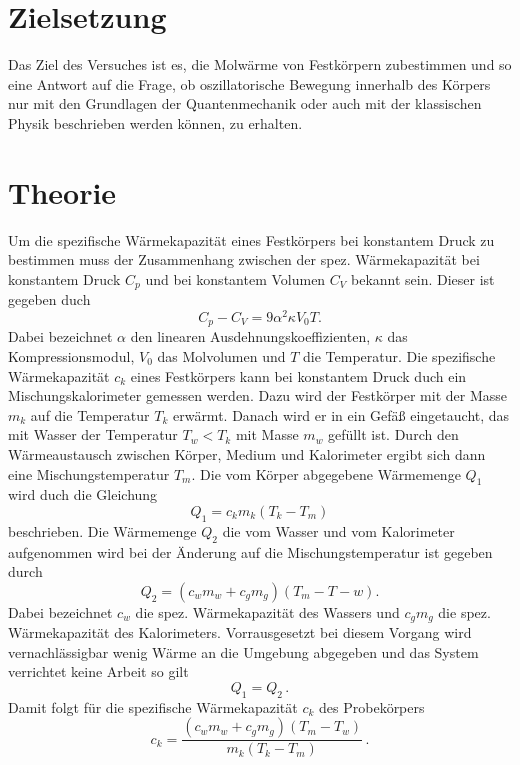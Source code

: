 \section{Zielsetzung}
Das Ziel des Versuches ist es, die Molwärme von Festkörpern zubestimmen und
so eine Antwort auf die Frage, ob oszillatorische Bewegung innerhalb des Körpers
nur mit den Grundlagen der Quantenmechanik oder auch mit der klassischen Physik
beschrieben werden können, zu erhalten.
\section{Theorie}
\label{sec:Theorie}
Um die spezifische Wärmekapazität eines Festkörpers bei konstantem Druck zu
bestimmen muss der Zusammenhang zwischen der spez. Wärmekapazität bei
konstantem Druck $C_p$ und bei konstantem Volumen $C_V$ bekannt sein. Dieser ist
gegeben duch
\begin{equation}
  C_p - C_V = 9 \alpha^2 \kappa V_0 T.
\end{equation}
Dabei bezeichnet $\alpha$ den linearen Ausdehnungskoeffizienten,
$\kappa$ das Kompressionsmodul, $V_0$ das Molvolumen und $T$ die Temperatur.
Die spezifische Wärmekapazität $c_k $ eines Festkörpers kann bei konstantem
Druck duch ein Mischungskalorimeter gemessen werden. Dazu wird der Festkörper
mit der Masse $m_k$ auf die Temperatur $T_k$ erwärmt. Danach wird er in ein Gefäß
eingetaucht, das mit Wasser der Temperatur $ T_w < T_k $ mit Masse $m_w$ gefüllt
ist. Durch den Wärmeaustausch zwischen Körper, Medium und Kalorimeter ergibt sich dann
eine Mischungstemperatur $T_m$.  Die vom Körper abgegebene Wärmemenge $Q_1$
wird duch die Gleichung
\begin{equation}
  Q_1 = c_k m_k (T_k - T_m)
\end{equation}
beschrieben. Die Wärmemenge $Q_2$ die vom Wasser und vom Kalorimeter aufgenommen wird
bei der Änderung auf die Mischungstemperatur ist gegeben durch
\begin{equation}
  Q_2 = (c_w m_w + c_g m_g)(T_m - T-w).
\end{equation}
Dabei bezeichnet $c_w$ die spez. Wärmekapazität des Wassers und
$c_gm_g$ die spez. Wärmekapazität des Kalorimeters.
Vorrausgesetzt bei diesem Vorgang wird vernachlässigbar wenig Wärme an die
Umgebung abgegeben und das System verrichtet keine Arbeit so gilt
\begin{equation*}
  Q_1 = Q_2 \, .
\end{equation*}
Damit folgt für die spezifische Wärmekapazität $c_k$ des Probekörpers
\begin{equation}
  c_k = \frac{(c_w m_w + c_g m_g)(T_m - T_w)}{m_k ( T_k - T_m)}\, .
\end{equation}
